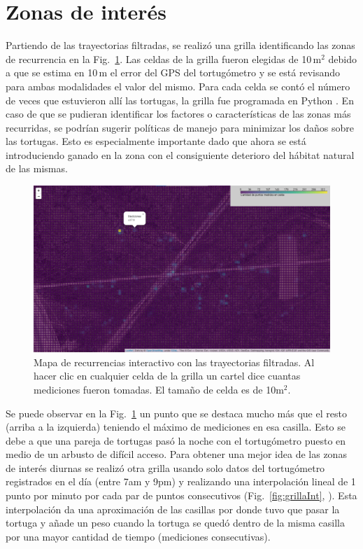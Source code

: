 \section{Zonas de interés}
Partiendo de las trayectorias filtradas, se realizó  una grilla identificando las zonas de recurrencia en la Fig.~\ref{fig:grilla1}. Las celdas de la grilla fueron elegidas de 10\,m$^2$ debido a que se estima en 10\,m el error del GPS del tortugómetro y se está revisando para ambas modalidades el valor del mismo. Para cada celda se contó el número de veces que estuvieron allí las tortugas, la grilla fue programada en Python \cite{github}. En caso de que se pudieran identificar los factores o características de las zonas más recurridas, se podrían sugerir políticas de manejo para minimizar los daños sobre las tortugas. Esto es especialmente importante dado que ahora se está introduciendo ganado en la zona con el consiguiente deterioro del hábitat natural de las mismas.
 
 
\begin{figure}[ht]
    \begin{center}
    \includegraphics[width=\imsize]{Chap2/GrillaSintCNoche.png}
    \end{center}
    \caption[Mapa con zonas de recurrencia.]{Mapa de recurrencias  interactivo con las trayectorias filtradas. Al hacer clic en cualquier celda de la grilla un cartel dice cuantas mediciones fueron tomadas. El tamaño de celda es de 10m$^2$.}
    \label{fig:grilla1}
\end{figure}
 
Se puede observar en la Fig.~\ref{fig:grilla1} un punto que se destaca mucho más que el resto (arriba a la izquierda) teniendo el máximo de mediciones en esa casilla. Esto se debe a que una pareja de tortugas pasó la noche con el tortugómetro puesto en medio de un arbusto de difícil acceso. Para obtener una mejor idea de las zonas de interés diurnas se realizó otra grilla usando solo datos del tortugómetro registrados en el día (entre 7am y 9pm) y  realizando una interpolación lineal de 1 punto por minuto por cada par de puntos consecutivos (Fig.~\ref{fig:grillaInt}, \cite{github}). Esta interpolación da una aproximación de las casillas por donde tuvo que pasar la tortuga y añade un peso cuando la tortuga se quedó dentro de la misma casilla por una mayor cantidad de tiempo (mediciones consecutivas).
 
